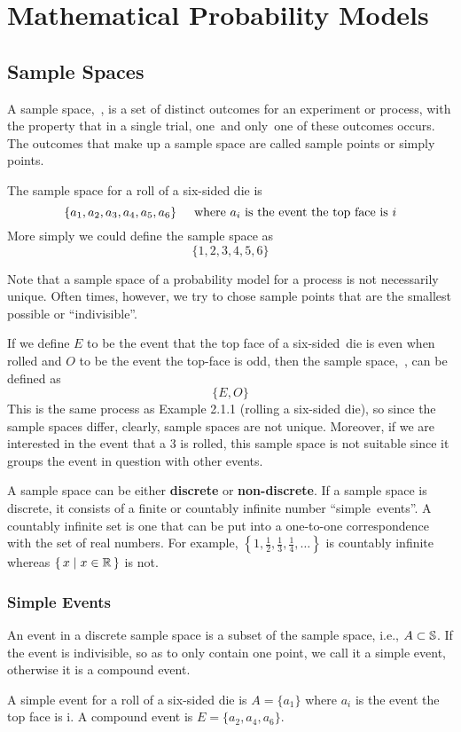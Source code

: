 \chapter{Mathematical Probability Models}
\section{Sample Spaces}
A sample space,~\sS, is a set of distinct outcomes for an experiment or process, with the property that in a single trial, one~and only~one of these outcomes occurs. The outcomes that make up a sample space are called sample points or simply points.
\begin{example}
The sample space for a roll of a six-sided die is
\[
    \{a_1,a_2,a_3,a_4,a_5,a_6\}\hspace{5mm}\text{where $a_i$ is the event the top face is $i$}
\]
More simply we could define the sample space as
\[
    \{1,2,3,4,5,6\}
\]
\end{example}
\begin{info}
Note that a sample space of a probability model for a process is not necessarily unique. Often times, however, we try to chose sample points that are the smallest possible or ``indivisible''.
\end{info}
\begin{example}
If we define $E$ to be the event that the top face of a six-sided~die is even when rolled and $O$ to be the event the top-face is odd, then the sample space,~\sS, can be defined as
\[
    \{E,O\}
\]
This is the same process as Example 2.1.1 (rolling a six-sided die), so since the sample spaces differ, clearly, sample spaces are not unique. Moreover, if we are interested in the event that a 3 is rolled, this sample space is not suitable since it groups the event in question with other events.
\end{example}
A sample space can be either \textbf{discrete} or \textbf{non-discrete}. If a sample space is discrete, it consists of a finite or countably infinite number ``simple~events''. A countably infinite set is one that can be put into a one-to-one correspondence with the set of real numbers. For example, $\left\{1,\frac{1}{2},\frac{1}{3},\frac{1}{4},\ldots\right\}$ is countably infinite whereas $\{\,x \mid x\in\mathbb{R}\,\}$ is not.
\subsection*{Simple Events}
An event in a discrete sample space is a subset of the sample space, i.e., $A \subset \mathbb{S}$. If the event is indivisible, so as to only contain one point, we call it a simple event, otherwise it is a compound event.
\begin{example}
A simple event for a roll of a six-sided die is $A = \{a_1\}$ where $a_i$ is the event the top face is i. A compound event is $E = \{a_2,a_4,a_6\}$.
\end{example}

